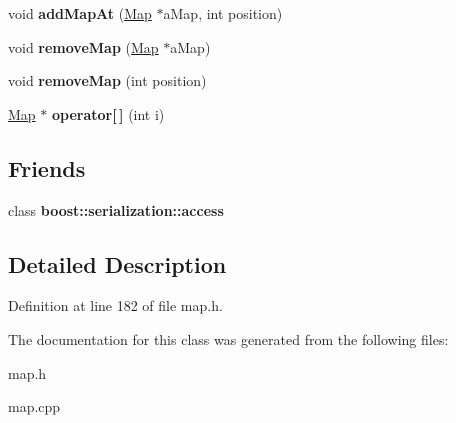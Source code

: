\begin{DoxyCompactItemize}
void {\bfseries add\+Map\+At} (\hyperlink{class_map}{Map} $\ast$a\+Map, int position)
\item 
\hypertarget{class_campain_abbe7186905f7b9f8e0772af60c78e6f1}{}\label{class_campain_abbe7186905f7b9f8e0772af60c78e6f1} 
void {\bfseries remove\+Map} (\hyperlink{class_map}{Map} $\ast$a\+Map)
\item 
\hypertarget{class_campain_ac6a634b0149cbab03905e352d575e807}{}\label{class_campain_ac6a634b0149cbab03905e352d575e807} 
void {\bfseries remove\+Map} (int position)
\item 
\hypertarget{class_campain_a9e2011c5dc482e3e921d5141ea316cfc}{}\label{class_campain_a9e2011c5dc482e3e921d5141ea316cfc} 
\hyperlink{class_map}{Map} $\ast$ {\bfseries operator\mbox{[}$\,$\mbox{]}} (int i)
\end{DoxyCompactItemize}
\subsection*{Friends}
\begin{DoxyCompactItemize}
\item 
\hypertarget{class_campain_ac98d07dd8f7b70e16ccb9a01abf56b9c}{}\label{class_campain_ac98d07dd8f7b70e16ccb9a01abf56b9c} 
class {\bfseries boost\+::serialization\+::access}
\end{DoxyCompactItemize}


\subsection{Detailed Description}


Definition at line 182 of file map.\+h.



The documentation for this class was generated from the following files\+:\begin{DoxyCompactItemize}
\item 
map.\+h\item 
map.\+cpp\end{DoxyCompactItemize}
